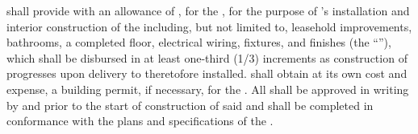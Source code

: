 \lessor shall provide \lessee with an allowance of \lesseeAllowanceTotalText, for the \premises, for the purpose of \lessee's installation and interior construction of the \premises including, but not limited to, leasehold improvements, bathrooms, a completed floor, electrical wiring, fixtures, and finishes (the ``''), which shall be disbursed in at least one-third (1/3) increments as construction of \lesseeImprovements progresses upon delivery to \lesseeImprovements theretofore installed. \lessee shall obtain at its own cost and expense, a building permit, if necessary, for the \lesseeImprovements. All \lesseeImprovements shall be approved in writing by \lessee and \lessor prior to the start of construction of said \lesseeImprovements and shall be completed in conformance with the plans and specifications of the \lessor.

